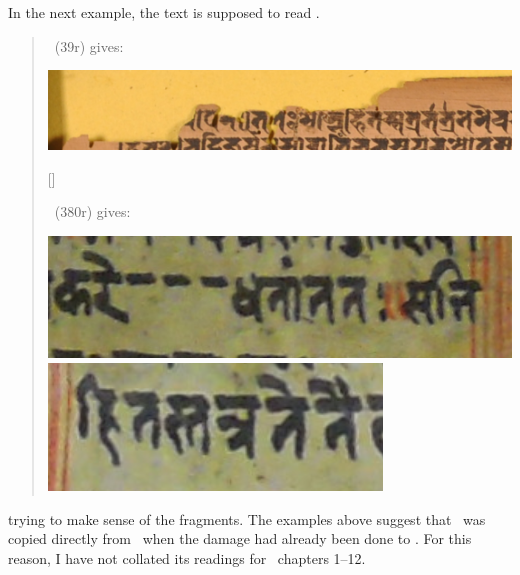 \noindent
In the next example, the text is supposed to read
. 


\begin{quote}
\msNa\ (\fol39r) gives:

\includegraphics[scale=.21]{images/hitas_msNa.png}

[] 

\msL\ (\fol380r) gives:

\includegraphics[scale=.3]{images/hitas01_msL.png}
\includegraphics[scale=.3]{images/hitas02_msL.png}

\end{quote}

\noindent
trying to make sense of the fragments. The examples above
suggest that \msL\ was copied directly from \msNa\
when the damage had already been done to \msNa. For this reason,
I have not collated its readings for \VSS\ chapters 1--12.


\medskip







